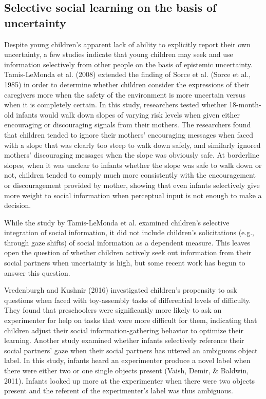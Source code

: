 \documentclass[floatsintext,man]{apa6}
\theoremstyle{definition}
\theoremstyle{definition}
\theoremstyle{definition}
\theoremstyle{remark}
\begin{document}
\subsection{Selective social learning on the basis of
uncertainty}\label{selective-social-learning-on-the-basis-of-uncertainty}

Despite young children's apparent lack of ability to explicitly report
their own uncertainty, a few studies indicate that young children may
seek and use information selectively from other people on the basis of
epistemic uncertainty. Tamis-LeMonda et al. (2008) extended the finding
of Sorce et al. (Sorce et al., 1985) in order to determine whether
children consider the expressions of their caregivers more when the
safety of the environment is more uncertain versus when it is completely
certain. In this study, researchers tested whether 18-month-old infants
would walk down slopes of varying risk levels when given either
encouraging or discouraging signals from their mothers. The researchers
found that children tended to ignore their mothers' encouraging messages
when faced with a slope that was clearly too steep to walk down safely,
and similarly ignored mothers' discouraging messages when the slope was
obviously safe. At borderline slopes, when it was unclear to infants
whether the slope was safe to walk down or not, children tended to
comply much more consistently with the encouragement or discouragement
provided by mother, showing that even infants selectively give more
weight to social information when perceptual input is not enough to make
a decision.

While the study by Tamis-LeMonda et al. examined children's selective
integration of social information, it did not include children's
solicitations (e.g., through gaze shifts) of social information as a
dependent measure. This leaves open the question of whether children
actively seek out information from their social partners when
uncertainty is high, but some recent work has begun to answer this
question.

Vredenburgh and Kushnir (2016) investigated children's propensity to ask
questions when faced with toy-assembly tasks of differential levels of
difficulty. They found that preschoolers were significantly more likely
to ask an experimenter for help on tasks that were more difficult for
them, indicating that children adjust their social information-gathering
behavior to optimize their learning. Another study examined whether
infants selectively reference their social partners' gaze when their
social partners has uttered an ambiguous object label. In this study,
infants heard an experimenter produce a novel label when there were
either two or one single objects present (Vaish, Demir, \& Baldwin,
2011). Infants looked up more at the experimenter when there were two
objects present and the referent of the experimenter's label was thus
ambiguous.
\end{document}
